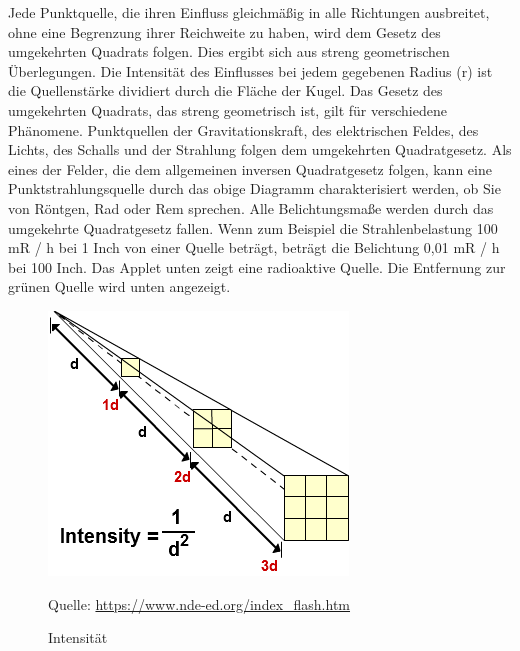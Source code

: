 {{Jede Punktquelle, die ihren Einfluss gleichmäßig in alle Richtungen ausbreitet, ohne eine Begrenzung ihrer Reichweite zu haben, wird dem Gesetz des umgekehrten Quadrats folgen. Dies ergibt sich aus streng geometrischen Überlegungen. Die Intensität des Einflusses bei jedem gegebenen Radius (r) ist die Quellenstärke dividiert durch die Fläche der Kugel. Das Gesetz des umgekehrten Quadrats, das streng geometrisch ist, gilt für verschiedene Phänomene. Punktquellen der Gravitationskraft, des elektrischen Feldes, des Lichts, des Schalls und der Strahlung folgen dem umgekehrten Quadratgesetz.
Als eines der Felder, die dem allgemeinen inversen Quadratgesetz folgen, kann eine Punktstrahlungsquelle durch das obige Diagramm charakterisiert werden, ob Sie von Röntgen, Rad oder Rem sprechen. Alle Belichtungsmaße werden durch das umgekehrte Quadratgesetz fallen.
Wenn zum Beispiel die Strahlenbelastung 100 mR / h bei 1 Inch von einer Quelle beträgt, beträgt die Belichtung 0,01 mR / h bei 100 Inch.
Das Applet unten zeigt eine radioaktive Quelle. Die Entfernung zur grünen Quelle wird unten angezeigt.
\begin{figure}[htb]
  \centering  
  \includegraphics[scale=0.7]{img/Intensitaet.png}
  \caption{Intensität}
  \label{fig:Intensität}
  Quelle: \url{https://www.nde-ed.org/index_flash.htm}
\end{figure}

}}
